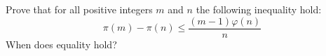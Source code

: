 Prove that for all positive integers $m$ and $n$ the following inequality hold:
$$\pi(m)-\pi(n)\leq\frac{(m-1)\varphi(n)}{n}$$When does equality hold?

